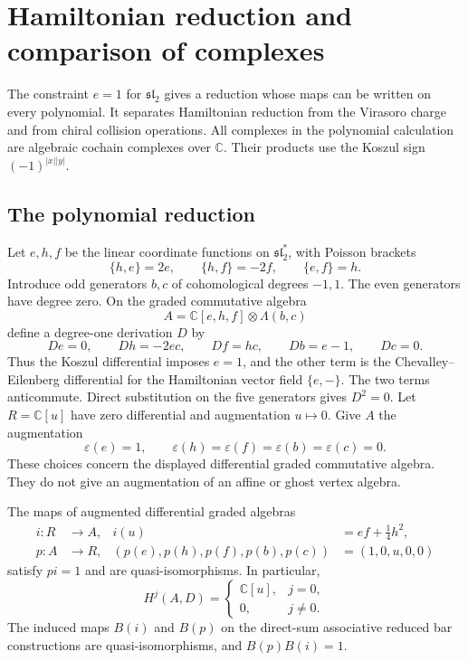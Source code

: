\section{Hamiltonian reduction and comparison of complexes}

The constraint $e=1$ for $\mathfrak{sl}_2$ gives a reduction whose maps can be written on every polynomial.
It separates Hamiltonian reduction from the Virasoro charge and from chiral collision operations.
All complexes in the polynomial calculation are algebraic cochain complexes over $\mathbb C$.
Their products use the Koszul sign $(-1)^{|x||y|}$.

\subsection{The polynomial reduction}

Let $e,h,f$ be the linear coordinate functions on $\mathfrak{sl}_2^*$, with Poisson brackets
\[
 \{h,e\}=2e,\qquad \{h,f\}=-2f,\qquad \{e,f\}=h.
\]
Introduce odd generators $b,c$ of cohomological degrees $-1,1$.
The even generators have degree zero.
On the graded commutative algebra
\[
 A=\mathbb C[e,h,f]\otimes\Lambda(b,c)
\]
define a degree-one derivation $D$ by
\begin{equation}\label{eq:cbc26-ds-differential}
 De=0,\qquad Dh=-2ec,\qquad Df=hc,
 \qquad Db=e-1,\qquad Dc=0.
\end{equation}
Thus the Koszul differential imposes $e=1$, and the other term is the Chevalley--Eilenberg differential for the Hamiltonian vector field $\{e,-\}$.
The two terms anticommute.
Direct substitution on the five generators gives $D^2=0$.
Let $R=\mathbb C[u]$ have zero differential and augmentation $u\mapsto0$.
Give $A$ the augmentation
\[
 \varepsilon(e)=1,\qquad
 \varepsilon(h)=\varepsilon(f)=\varepsilon(b)=\varepsilon(c)=0.
\]
These choices concern the displayed differential graded commutative algebra.
They do not give an augmentation of an affine or ghost vertex algebra.

\begin{theorem}
\label{thm:cbc26-polynomial-ds}
The maps of augmented differential graded algebras
\begin{align}
 i:R&\longrightarrow A,& i(u)&=ef+\tfrac14h^2,\label{eq:cbc26-ds-inclusion}\\
 p:A&\longrightarrow R,&
 (p(e),p(h),p(f),p(b),p(c))&=(1,0,u,0,0)
 \label{eq:cbc26-ds-projection}
\end{align}
satisfy $pi=1$ and are quasi-isomorphisms.
In particular,
\[
 H^j(A,D)=
 \begin{cases}\mathbb C[u],&j=0,\\0,&j\ne0.\end{cases}
\]
The induced maps $B(i)$ and $B(p)$ on the direct-sum associative reduced bar constructions are quasi-isomorphisms, and $B(p)B(i)=1$.
\end{theorem}


